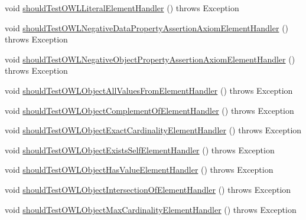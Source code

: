 \begin{DoxyCompactItemize}
\item 
void \hyperlink{classorg_1_1semanticweb_1_1owlapi_1_1contract_1_1_contract_owlxmlparser_test_a7bf624a3cb02959fe597cf06847f00c0}{should\-Test\-O\-W\-L\-Literal\-Element\-Handler} ()  throws Exception 
\item 
void \hyperlink{classorg_1_1semanticweb_1_1owlapi_1_1contract_1_1_contract_owlxmlparser_test_a301f16d5c63bb5c1c6d8ed1f4ac49a04}{should\-Test\-O\-W\-L\-Negative\-Data\-Property\-Assertion\-Axiom\-Element\-Handler} ()  throws Exception 
\item 
void \hyperlink{classorg_1_1semanticweb_1_1owlapi_1_1contract_1_1_contract_owlxmlparser_test_a9316fd5426a5abc3326e1bc89998807a}{should\-Test\-O\-W\-L\-Negative\-Object\-Property\-Assertion\-Axiom\-Element\-Handler} ()  throws Exception 
\item 
void \hyperlink{classorg_1_1semanticweb_1_1owlapi_1_1contract_1_1_contract_owlxmlparser_test_a423c2c4bd6a2e4b278947ee3a190e0d2}{should\-Test\-O\-W\-L\-Object\-All\-Values\-From\-Element\-Handler} ()  throws Exception 
\item 
void \hyperlink{classorg_1_1semanticweb_1_1owlapi_1_1contract_1_1_contract_owlxmlparser_test_a6727eedd2b4ad071a95d9a7bd600c50c}{should\-Test\-O\-W\-L\-Object\-Complement\-Of\-Element\-Handler} ()  throws Exception 
\item 
void \hyperlink{classorg_1_1semanticweb_1_1owlapi_1_1contract_1_1_contract_owlxmlparser_test_a871754fb3b0e433cf877e5dd86a7bc69}{should\-Test\-O\-W\-L\-Object\-Exact\-Cardinality\-Element\-Handler} ()  throws Exception 
\item 
void \hyperlink{classorg_1_1semanticweb_1_1owlapi_1_1contract_1_1_contract_owlxmlparser_test_a4331758eb7ce25f368182df51883998f}{should\-Test\-O\-W\-L\-Object\-Exists\-Self\-Element\-Handler} ()  throws Exception 
\item 
void \hyperlink{classorg_1_1semanticweb_1_1owlapi_1_1contract_1_1_contract_owlxmlparser_test_af127ed6f12c96bdf9cb1a83f4c0435b9}{should\-Test\-O\-W\-L\-Object\-Has\-Value\-Element\-Handler} ()  throws Exception 
\item 
void \hyperlink{classorg_1_1semanticweb_1_1owlapi_1_1contract_1_1_contract_owlxmlparser_test_a7b16cf1c827fe32c4710f26fbf48853e}{should\-Test\-O\-W\-L\-Object\-Intersection\-Of\-Element\-Handler} ()  throws Exception 
\item 
void \hyperlink{classorg_1_1semanticweb_1_1owlapi_1_1contract_1_1_contract_owlxmlparser_test_a96b4f18cd37af26ddeef95d8096d3f06}{should\-Test\-O\-W\-L\-Object\-Max\-Cardinality\-Element\-Handler} ()  throws Exception 

\end{DoxyCompactItemize}
